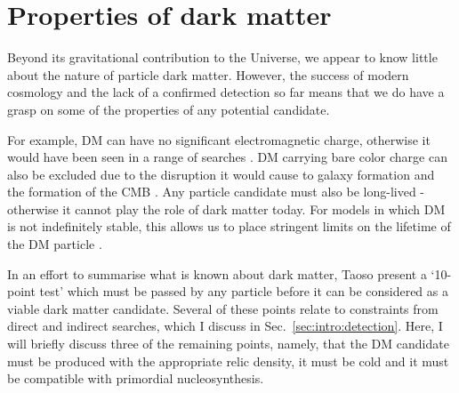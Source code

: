 
\section{Properties of dark matter}
\label{intro:sec:properties}

Beyond its gravitational contribution to the Universe, we appear to know little about the nature of particle dark matter. However, the success of modern cosmology and the lack of a confirmed detection so far means that we do have a grasp on some of the properties of any potential candidate.

For example, DM can have no significant electromagnetic charge, otherwise it would have been seen in a range of searches \cite{Kudo:2001,Perl:2001,Gninenko:2007,Melchiorri:2007}. DM carrying bare color charge can also be excluded due to the disruption it would cause to galaxy formation \cite{Natarajan:2002} and the formation of the CMB \cite{Chen:2002}. Any particle candidate must also be long-lived - otherwise it cannot play the role of dark matter today. For models in which DM is not indefinitely stable, this allows us to place stringent limits on the lifetime of the DM particle \cite{Amigo:2009,Bell:2010}. %

In an effort to summarise what is known about dark matter, Taoso \etal \cite{Taoso:2008} present a `10-point test' which must be passed by any particle before it can be considered as a viable dark matter candidate. Several of these points relate to constraints from direct and indirect searches, which I discuss in Sec.~\ref{sec:intro:detection}. Here, I will briefly discuss three of the remaining points, namely, that the DM candidate must be produced with the appropriate relic density, it must be cold and it must be compatible with primordial nucleosynthesis.


